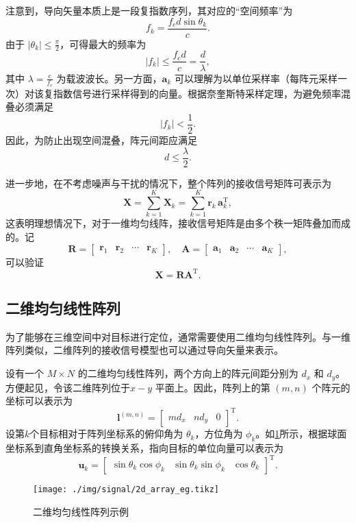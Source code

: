 注意到，导向矢量本质上是一段复指数序列，其对应的``空间频率''为
\[
    f_k = \frac{f_c d \sin\theta_k}{c}.
\]
由于 \( |\theta_k| \leq \tfrac{\pi}{2} \)，可得最大的频率为
\[
    |f_k| \leq \frac{f_c d}{c} = \frac{d}{\lambda},
\]
其中 \(\lambda = \tfrac{c}{f_c}\) 为载波波长。另一方面，\(\bm{a}_k\) 可以理解为以单位采样率（每阵元采样一次）对该复指数信号进行采样得到的向量。根据奈奎斯特采样定理，为避免频率混叠必须满足
\[
    |f_k| < \frac{1}{2}.
\]
因此，为防止出现空间混叠，阵元间距应满足
\[
    d \leq \frac{\lambda}{2}.
\]


进一步地，在不考虑噪声与干扰的情况下，整个阵列的接收信号矩阵可表示为
\[
    \mathbf{X}
    = \sum_{k=1}^{K} \mathbf{X}_k
    = \sum_{k=1}^{K} \bm{r}_k \, \bm{a}_k^{\mathrm{T}},
\]
这表明理想情况下，对于一维均匀线阵，接收信号矩阵是由多个秩一矩阵叠加而成的。记
\[
    \mathbf{R} = \begin{bmatrix}
        \bm{r}_1 & \bm{r}_2 & \cdots & \bm{r}_K
    \end{bmatrix}, \quad \mathbf{A} = \begin{bmatrix}
        \bm{a}_1 & \bm{a}_2 & \cdots & \bm{a}_K
    \end{bmatrix},
\]
可以验证
\[
    \mathbf{X} = \mathbf{R} \mathbf{A}^{\mathrm{T}}.
\]

\subsection{二维均匀线性阵列}
为了能够在三维空间中对目标进行定位，通常需要使用二维均匀线性阵列。与一维阵列类似，二维阵列的接收信号模型也可以通过导向矢量来表示。

设有一个 \(M \times N\) 的二维均匀线性阵列，两个方向上的阵元间距分别为 \(d_x\) 和 \(d_y\)。方便起见，令该二维阵列位于\( x-y \) 平面上。因此，阵列上的第 \( (m,n) \) 个阵元的坐标可以表示为
\[
    \bm{l}^{(m, n)} = \begin{bmatrix}
        m d_x & n d_y & 0
    \end{bmatrix}^{\mathrm{T}}.
\]
设第\( k \)个目标相对于阵列坐标系的俯仰角为 \(\theta_k\)，方位角为 \(\phi_k\)。如\cref{fig_2d_array_eg}所示，根据球面坐标系到直角坐标系的转换关系，指向目标的单位向量可以表示为
\[
    \bm{u}_k = \begin{bmatrix}
        \sin\theta_k \cos\phi_k & \sin\theta_k \sin\phi_k & \cos\theta_k
    \end{bmatrix}^{\mathrm{T}}.
\]

\begin{figure}[htb!]
    \centering
    \texttt{[image: ./img/signal/2d\_array\_eg.tikz]}
    \caption{二维均匀线性阵列示例}
    \label{fig_2d_array_eg}
\end{figure}

